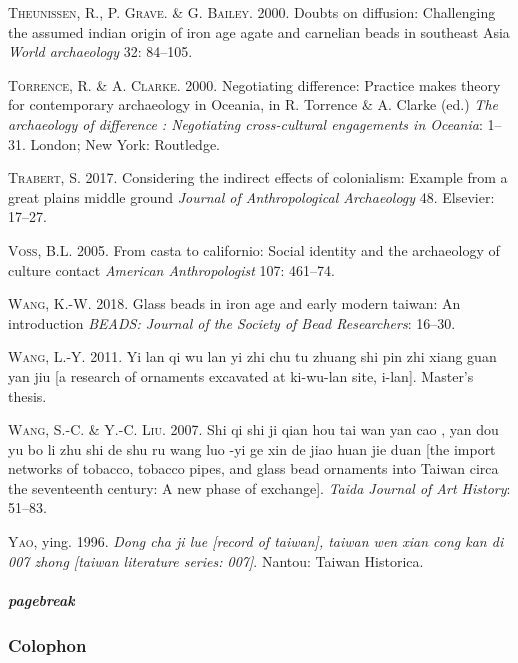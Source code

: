 \documentclass[]{article}
\let\oldsubparagraph\subparagraph
\renewcommand{\subparagraph}[1]{\oldsubparagraph{#1}\mbox{}}
\begin{document}
\leavevmode\hypertarget{ref-Theunissen2000}{}%
\textsc{Theunissen}, R., P. \textsc{Grave}. \& G. \textsc{Bailey}. 2000.
Doubts on diffusion: Challenging the assumed indian origin of iron age
agate and carnelian beads in southeast Asia \emph{World archaeology} 32:
84--105.

\leavevmode\hypertarget{ref-TorrenceandClarke2000}{}%
\textsc{Torrence}, R. \& A. \textsc{Clarke}. 2000. Negotiating
difference: Practice makes theory for contemporary archaeology in
Oceania, in R. Torrence \& A. Clarke (ed.) \emph{The archaeology of
difference : Negotiating cross-cultural engagements in Oceania}: 1--31.
London; New York: Routledge.

\leavevmode\hypertarget{ref-Trabert2017}{}%
\textsc{Trabert}, S. 2017. Considering the indirect effects of
colonialism: Example from a great plains middle ground \emph{Journal of
Anthropological Archaeology} 48. Elsevier: 17--27.

\leavevmode\hypertarget{ref-Voss2005}{}%
\textsc{Voss}, B.L. 2005. From casta to californio: Social identity and
the archaeology of culture contact \emph{American Anthropologist} 107:
461--74.

\leavevmode\hypertarget{ref-Wang2018}{}%
\textsc{Wang}, K.-W. 2018. Glass beads in iron age and early modern
taiwan: An introduction \emph{BEADS: Journal of the Society of Bead
Researchers}: 16--30.

\leavevmode\hypertarget{ref-Wang2011}{}%
\textsc{Wang}, L.-Y. 2011. Yi lan qi wu lan yi zhi chu tu zhuang shi pin
zhi xiang guan yan jiu {[}a research of ornaments excavated at ki-wu-lan
site, i-lan{]}. Master's thesis.

\leavevmode\hypertarget{ref-Wang2007}{}%
\textsc{Wang}, S.-C. \& Y.-C. \textsc{Liu}. 2007. Shi qi shi ji qian hou
tai wan yan cao , yan dou yu bo li zhu shi de shu ru wang luo -yi ge xin
de jiao huan jie duan {[}the import networks of tobacco, tobacco pipes,
and glass bead ornaments into Taiwan circa the seventeenth century: A
new phase of exchange{]}. \emph{Taida Journal of Art History}: 51--83.

\leavevmode\hypertarget{ref-Yao1996}{}%
\textsc{Yao}, ying. 1996. \emph{Dong cha ji lue {[}record of taiwan{]},
taiwan wen xian cong kan di 007 zhong {[}taiwan literature series:
007{]}}. Nantou: Taiwan Historica.

\hypertarget{pagebreak-1}{%
\subparagraph{pagebreak}\label{pagebreak-1}}

\hypertarget{colophon}{%
\subsubsection{Colophon}\label{colophon}}
\end{document}
